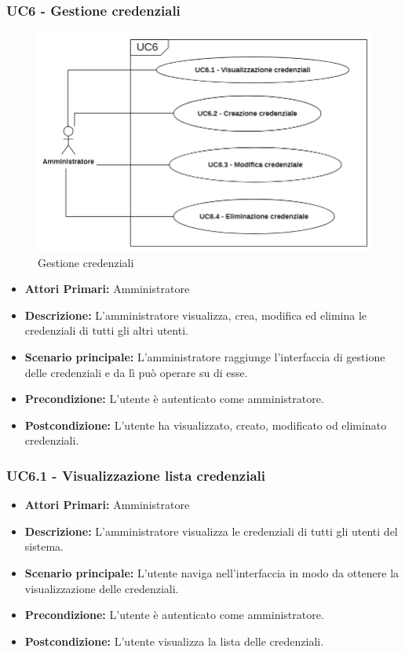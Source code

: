 \subsubsection{ UC6 - Gestione credenziali}
\begin{figure}[H]
	\centering
	\includegraphics[width=15cm]{res/images/UC6.png}
	\caption{Gestione credenziali}
	\label{fig:Gestione credenziali}
\end{figure}
\begin{itemize}
           	\item\textbf{Attori Primari:} 
           	Amministratore
           	\item\textbf{Descrizione:} 
           	L'amministratore visualizza, crea, modifica ed elimina le credenziali di tutti gli altri utenti.
           	\item\textbf{Scenario principale:} 
           	L'amministratore raggiunge l'interfaccia di gestione delle credenziali e da lì può operare su di esse.
           	\item\textbf{Precondizione:} 
           	L'utente è autenticato come amministratore.
           	\item\textbf{Postcondizione:}
           	L'utente ha visualizzato, creato, modificato od eliminato credenziali.
\end{itemize}

\subsubsection{ UC6.1 - Visualizzazione lista credenziali}
\begin{itemize}
	\item\textbf{Attori Primari:} 
	Amministratore
	\item\textbf{Descrizione:} 
	L'amministratore visualizza le credenziali di tutti gli utenti del sistema.
	\item\textbf{Scenario principale:} 
	L'utente naviga nell'interfaccia in modo da ottenere la visualizzazione delle credenziali.
	\item\textbf{Precondizione:} 
	L'utente è autenticato come amministratore.
	\item\textbf{Postcondizione:}
	L'utente visualizza la lista delle credenziali.
\end{itemize}

